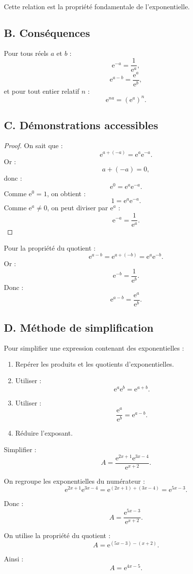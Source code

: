 \documentclass[11pt,a4paper]{article}
\newcommand{\e}{\mathrm{e}}
\begin{document}
Cette relation est la propriété fondamentale de l'exponentielle.

\subsection*{B. Conséquences}

\begin{propriete}
Pour tous réels $a$ et $b$ :
\[
\e^{-a}=\frac{1}{\e^a},
\]
\[
\e^{a-b}=\frac{\e^a}{\e^b},
\]
et pour tout entier relatif $n$ :
\[
\e^{na}=(\e^a)^n.
\]
\end{propriete}

\subsection*{C. Démonstrations accessibles}

\begin{proof}
On sait que :
\[
\e^{a+(-a)}=\e^a\e^{-a}.
\]
Or :
\[
a+(-a)=0,
\]
donc :
\[
\e^0=\e^a\e^{-a}.
\]
Comme $\e^0=1$, on obtient :
\[
1=\e^a\e^{-a}.
\]
Comme $\e^a \neq 0$, on peut diviser par $\e^a$ :
\[
\e^{-a}=\frac{1}{\e^a}.
\]
\end{proof}

Pour la propriété du quotient :
\[
\e^{a-b}=\e^{a+(-b)}=\e^a\e^{-b}.
\]
Or :
\[
\e^{-b}=\frac{1}{\e^b}.
\]
Donc :
\[
\e^{a-b}=\frac{\e^a}{\e^b}.
\]

\subsection*{D. Méthode de simplification}

\begin{methode}
Pour simplifier une expression contenant des exponentielles :
\begin{enumerate}
    \item Repérer les produits et les quotients d'exponentielles.
    \item Utiliser :
    \[
    \e^a\e^b=\e^{a+b}.
    \]
    \item Utiliser :
    \[
    \frac{\e^a}{\e^b}=\e^{a-b}.
    \]
    \item Réduire l'exposant.
\end{enumerate}
\end{methode}

\begin{exemplebox}
Simplifier :
\[
A=\frac{\e^{2x+1}\e^{3x-4}}{\e^{x+2}}.
\]

On regroupe les exponentielles du numérateur :
\[
\e^{2x+1}\e^{3x-4}=\e^{(2x+1)+(3x-4)}=\e^{5x-3}.
\]

Donc :
\[
A=\frac{\e^{5x-3}}{\e^{x+2}}.
\]

On utilise la propriété du quotient :
\[
A=\e^{(5x-3)-(x+2)}.
\]

Ainsi :
\[
A=\e^{4x-5}.
\]
\end{exemplebox}
\end{document}
